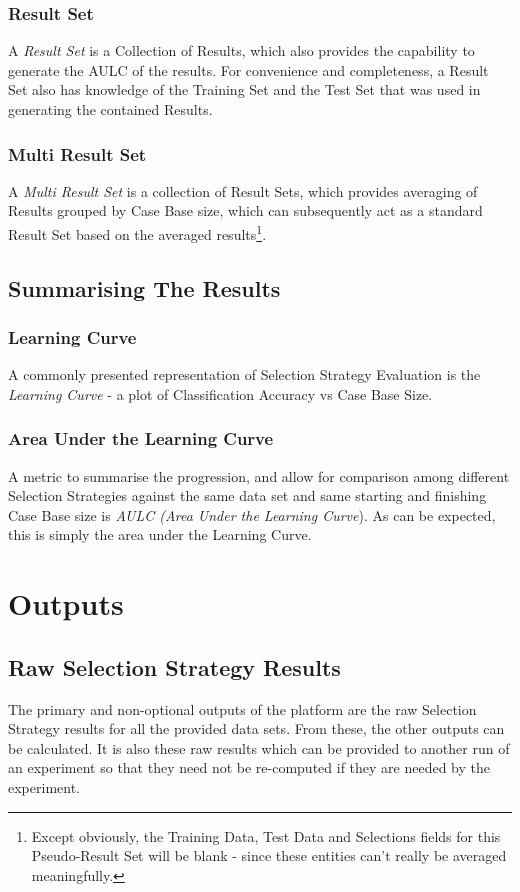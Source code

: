 \documentclass[a4paper,11pt]{report}
\begin{document}
\subsubsection{Result Set}
A \emph{Result Set} is a Collection of Results, which also provides the capability to generate the AULC of the results. For convenience and completeness, a Result Set also has knowledge of the Training Set and the Test Set that was used in generating the contained Results.

\subsubsection{Multi Result Set}
A \emph{Multi Result Set} is a collection of Result Sets, which provides averaging of Results grouped by Case Base size, which can subsequently act as a standard Result Set based on the averaged results\footnote{Except obviously, the Training Data, Test Data and Selections fields for this Pseudo-Result Set will be blank - since these entities can't really be averaged meaningfully.}.

\subsection{Summarising The Results}
\subsubsection{Learning Curve}\label{sec:multiresultset}
A commonly presented representation of Selection Strategy Evaluation is the \emph{Learning Curve} - a plot of Classification Accuracy vs Case Base Size.

\subsubsection{Area Under the Learning Curve}
A metric to summarise the progression, and allow for comparison among different Selection Strategies against the same data set and same starting and finishing Case Base size is \emph{AULC (Area Under the Learning Curve}). As can be expected, this is simply the area under the Learning Curve.

\section{Outputs}

\subsection{Raw Selection Strategy Results}
The primary and non-optional outputs of the platform are the raw Selection Strategy results for all the provided data sets. From these, the other outputs can be calculated. It is also these raw results which can be provided to another run of an experiment so that they need not be re-computed if they are needed by the experiment. 
\end{document}
